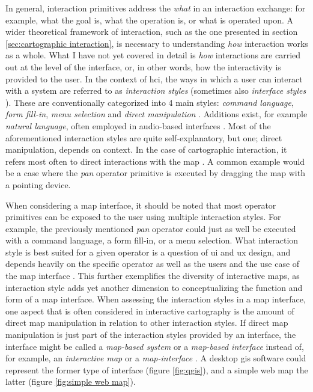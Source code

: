 

In general, interaction primitives
address the \textit{what} in an interaction exchange:
for example, what the goal is, what the operation is, or what is operated upon.
A wider theoretical framework of interaction, such as the one presented in
section \ref{sec:cartographic interaction},
is necessary to understanding \textit{how} interaction works as a whole.
What I have not yet covered in detail is
\textit{how} interactions are carried out at the level of the interface, or,
in other words, how the interactivity is provided to the user.
In the context of \acrshort{hci},
the ways in which a user can interact with a system are referred to as
\textit{interaction styles} \parencite{shn1995}
(sometimes also \textit{interface styles} \parencite{how1996}).
These are conventionally categorized into 4 main styles:
\textit{command language},
\textit{form fill-in},
\textit{menu selection} and
\textit{direct manipulation}
\parencite{soe2015}.
Additions exist, for example \textit{natural language},
often employed in audio-based interfaces \parencite{duc2018}.
Most of the aforementioned interaction styles are quite self-explanatory,
but one; direct manipulation, depends on context.
In the case of cartographic interaction,
it refers most often to direct interactions with the map \parencite{rot2012}.
A common example would be a case where the \textit{pan} operator primitive
is executed by dragging the map with a pointing device.

When considering a map interface,
it should be noted that most operator primitives
can be exposed to the user using multiple interaction styles.
For example, the previously mentioned \textit{pan} operator could just as well
be executed with a command language, a form fill-in, or a menu selection.
What interaction style is best suited for a given operator is a question
of \acrshort{ui} and \acrshort{ux} design,
and depends heavily on the specific operator as well as
the users and the use case of the map interface \parencite{rot2015}.
This further exemplifies the diversity of interactive maps,
as interaction style adds yet another dimension to conceptualizing the
function and form of a map interface.
When assessing the interaction styles in a map interface,
one aspect that is often considered in interactive cartography
is the amount of direct map manipulation in relation to other interaction styles.
If direct map manipulation is just part of
the interaction styles provided by an interface,
the interface might be called
a \textit{map-based system} or a \textit{map-based interface}
instead of, for example,
an \textit{interactive map} or a \textit{map-interface} \parencite{rot2013b}.
A desktop \acrshort{gis} software could represent the former type of interface (figure \ref{fig:qgis}),
and a simple web map the latter (figure \ref{fig:simple web map}).

